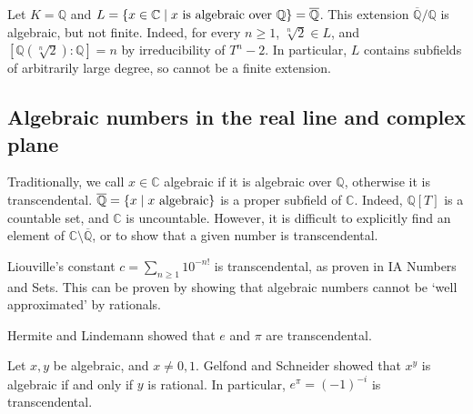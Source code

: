 \begin{example}
	Let \( K = \mathbb Q \) and \( L = \qty{x \in \mathbb C \mid x \text{ is algebraic over } \mathbb Q} = \overline{\mathbb Q} \).
	This extension \( \overline{\mathbb Q}/\mathbb Q \) is algebraic, but not finite.
	Indeed, for every \( n \geq 1 \), \( \sqrt[n]{2} \in L \), and \( [\mathbb Q(\sqrt[n]{2}):\mathbb Q] = n \) by irreducibility of \( T^n - 2 \).
	In particular, \( L \) contains subfields of arbitrarily large degree, so cannot be a finite extension.
\end{example}

\subsection{Algebraic numbers in the real line and complex plane}
Traditionally, we call \( x \in \mathbb C \) algebraic if it is algebraic over \( \mathbb Q \), otherwise it is transcendental.
\( \overline{\mathbb Q} = \qty{x \mid x \text{ algebraic}} \) is a proper subfield of \( \mathbb C \).
Indeed, \( \mathbb Q[T] \) is a countable set, and \( \mathbb C \) is uncountable.
However, it is difficult to explicitly find an element of \( \mathbb C \setminus \overline{\mathbb Q} \), or to show that a given number is transcendental.
\begin{example}
	Liouville's constant \( c = \sum_{n \geq 1} 10^{-n!} \) is transcendental, as proven in IA Numbers and Sets.
	This can be proven by showing that algebraic numbers cannot be `well approximated' by rationals.
\end{example}
\begin{example}
	Hermite and Lindemann showed that \( e \) and \( \pi \) are transcendental.
\end{example}
\begin{example}
	Let \( x, y \) be algebraic, and \( x \neq 0,1 \).
	Gelfond and Schneider showed that \( x^y \) is algebraic if and only if \( y \) is rational.
	In particular, \( e^\pi = (-1)^{-i} \) is transcendental.
\end{example}

